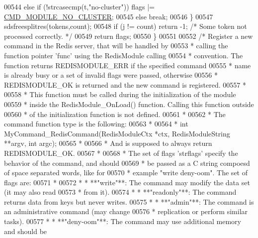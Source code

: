\begin{DoxyCode}
{00544         \textcolor{keywordflow}{else} \textcolor{keywordflow}{if} (!strcasecmp(t,\textcolor{stringliteral}{"no-cluster"})) flags |= 
      \hyperlink{server_8h_abf1e33c6cd6f59383cb155fa0e164fcd}{CMD\_MODULE\_NO\_CLUSTER};
00545         \textcolor{keywordflow}{else} \textcolor{keywordflow}{break};
00546     \}
00547     sdsfreesplitres(tokens,count);
00548     \textcolor{keywordflow}{if} (j != count) \textcolor{keywordflow}{return} -1; \textcolor{comment}{/* Some token not processed correctly. */}
00549     \textcolor{keywordflow}{return} flags;
00550 \}
00551 
00552 \textcolor{comment}{/* Register a new command in the Redis server, that will be handled by}
00553 \textcolor{comment}{ * calling the function pointer 'func' using the RedisModule calling}
00554 \textcolor{comment}{ * convention. The function returns REDISMODULE\_ERR if the specified command}
00555 \textcolor{comment}{ * name is already busy or a set of invalid flags were passed, otherwise}
00556 \textcolor{comment}{ * REDISMODULE\_OK is returned and the new command is registered.}
00557 \textcolor{comment}{ *}
00558 \textcolor{comment}{ * This function must be called during the initialization of the module}
00559 \textcolor{comment}{ * inside the RedisModule\_OnLoad() function. Calling this function outside}
00560 \textcolor{comment}{ * of the initialization function is not defined.}
00561 \textcolor{comment}{ *}
00562 \textcolor{comment}{ * The command function type is the following:}
00563 \textcolor{comment}{ *}
00564 \textcolor{comment}{ *      int MyCommand\_RedisCommand(RedisModuleCtx *ctx, RedisModuleString **argv, int argc);}
00565 \textcolor{comment}{ *}
00566 \textcolor{comment}{ * And is supposed to always return REDISMODULE\_OK.}
00567 \textcolor{comment}{ *}
00568 \textcolor{comment}{ * The set of flags 'strflags' specify the behavior of the command, and should}
00569 \textcolor{comment}{ * be passed as a C string compoesd of space separated words, like for}
00570 \textcolor{comment}{ * example "write deny-oom". The set of flags are:}
00571 \textcolor{comment}{ *}
00572 \textcolor{comment}{ * * **"write"**:     The command may modify the data set (it may also read}
00573 \textcolor{comment}{ *                    from it).}
00574 \textcolor{comment}{ * * **"readonly"**:  The command returns data from keys but never writes.}
00575 \textcolor{comment}{ * * **"admin"**:     The command is an administrative command (may change}
00576 \textcolor{comment}{ *                    replication or perform similar tasks).}
00577 \textcolor{comment}{ * * **"deny-oom"**:  The command may use additional memory and should be}
}
\end{DoxyCode}
